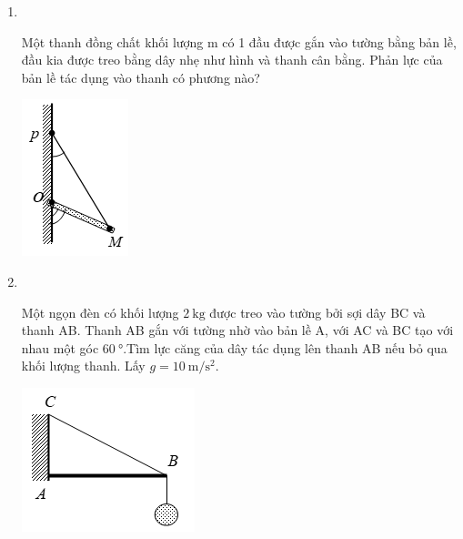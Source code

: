 \begin{enumerate}[label=\bfseries Câu \arabic*:, leftmargin=1.5cm]
\item {}\\
{Một thanh đồng chất khối lượng m có 1 đầu được gắn vào tường bằng bản lề, đầu kia được treo bằng dây nhẹ như hình và thanh cân bằng. Phản lực của bản lề tác dụng vào thanh có phương nào?
\begin{center}
	\includegraphics[width=0.15\linewidth]{../figs/VN10-2023-PH-TP0005-11}
\end{center}
}

\item {}\\
{Một ngọn đèn có khối lượng $\SI{2}{\kilogram}$ được treo vào tường bởi sợi dây BC và thanh AB. Thanh AB gắn với tường nhờ vào bản lề A, với AC và BC tạo với nhau một góc $\SI{60}{\degree}$.Tìm lực căng của dây tác dụng lên thanh AB nếu bỏ qua khối lượng thanh. Lấy $g=\SI{10}{\meter/\second^2}$.
\begin{center}
	\includegraphics[width=0.25\linewidth]{../figs/VN10-2023-PH-TP0005-12}
\end{center}
}


\end{enumerate}
